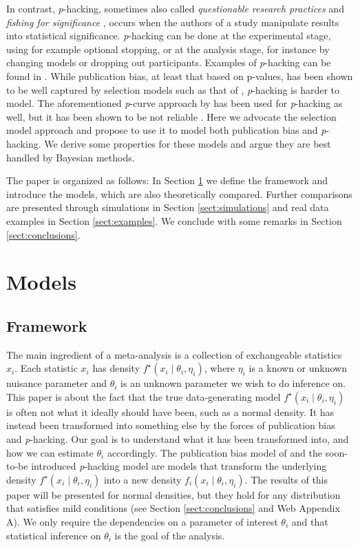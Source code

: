 \documentclass[useAMS,usenatbib,referee]{biom}
\begin{document}
In contrast, \textit{p}-hacking, sometimes also called \emph{questionable research practices} \citep{Sijtsma2016} and \emph{fishing for significance} \citep{Boulesteix2009}, occurs when the authors of a study manipulate results into statistical significance. \textit{p}-hacking can be done at the experimental stage, using for example optional stopping, or at the analysis stage, for instance by changing models or dropping out participants. Examples of \textit{p}-hacking can be found in \citet{simmons2011false}. While publication bias, at least that based on p-values, has been shown to be well captured by selection models such as that of \citet{hedges1992modeling} \citep{carter2019correcting}, \textit{p}-hacking is harder to model. The aforementioned \textit{p}-curve approach by \citet{simonsohn2014p} has been used for \textit{p}-hacking as well, but it has been shown to be not reliable \citep{BrunsIoannidis2016}. Here we advocate the selection model approach and propose to use it to model both publication bias and \textit{p}-hacking. We derive some properties for these models and argue they are best handled by Bayesian methods. 

The paper is organized as follows: In Section \ref{sect:models} we define the framework and introduce the models, which are also theoretically compared. Further comparisons are presented through simulations in Section \ref{sect:simulations} and real data examples in Section \ref{sect:examples}. We conclude with some remarks in Section \ref{sect:conclusions}.

\section{Models}\label{sect:models}

\subsection{Framework}
The main ingredient of a meta-analysis is a collection of exchangeable statistics $x_{i}$. Each statistic $x_{i}$ has density $f^{\star}(x_{i}\mid\theta_{i},\eta_{i})$, where $\eta_i$ is a known or unknown nuisance parameter and $\theta_{i}$ is an unknown parameter we wish to do inference on. This paper is about the fact that the true data-generating model $f^{\star}(x_{i}\mid\theta_{i},\eta_{i})$ is often not what it ideally should have been, such as a normal density. It has instead been transformed into something else by the forces of publication bias and \textit{p}-hacking. Our goal is to understand what it has been transformed into, and how we can estimate $\theta_{i}$ accordingly. The publication bias model of \citet{hedges1992modeling,iyengar1988selection} and the soon-to-be introduced \textit{p}-hacking model are models that transform the underlying density $f^{\star}(x_{i}\mid\theta_{i},\eta_{i})$ into a new density $f_{i}(x_{i}\mid\theta_{i},\eta_{i})$. The results of this paper will be presented for normal densities, but they hold for any distribution that satisfies mild conditions (see Section \ref{sect:conclusions} and Web Appendix A). We only require the dependencies on a parameter of interest $\theta_{i}$ and that statistical inference on $\theta_{i}$ is the goal of the analysis.
\end{document}
